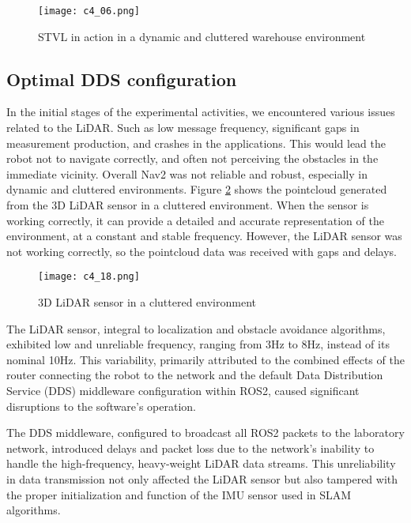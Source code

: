 \begin{figure}[t]
    \centering
    \texttt{[image: c4\_06.png]}
    \caption{STVL in action in a dynamic and cluttered warehouse environment}
    \label{fig:stvl}
\end{figure}


\subsection{Optimal DDS configuration}

In the initial stages of the experimental activities, we encountered various issues related to the LiDAR. 
Such as low message frequency, significant gaps in measurement production, and crashes in the applications.
This would lead the robot not to navigate correctly, and often not perceiving the obstacles in the immediate vicinity.
Overall Nav2 was not reliable and robust, especially in dynamic and cluttered environments.
Figure \ref{fig:3dlidar} shows the pointcloud generated from the 3D LiDAR sensor in a cluttered environment.
When the sensor is working correctly, it can provide a detailed and accurate representation of the environment,
at a constant and stable frequency. However, the LiDAR sensor was not working correctly, so the pointcloud data
was received with gaps and delays.

\begin{figure}[t]
    \centering
    \texttt{[image: c4\_18.png]}
    \caption{3D LiDAR sensor in a cluttered environment}
    \label{fig:3dlidar}
\end{figure}

The LiDAR sensor, integral to localization and obstacle avoidance algorithms, exhibited low and unreliable frequency,
ranging from 3Hz to 8Hz, instead of its nominal 10Hz.  This variability, primarily attributed to the combined 
effects of the router connecting the robot to the network and the default Data Distribution Service (DDS) middleware 
configuration within ROS2, caused significant disruptions to the software's operation.

The DDS middleware, configured to broadcast all ROS2 packets to the laboratory network, introduced delays and packet loss
due to the network's inability to handle the high-frequency, heavy-weight LiDAR data streams.  
This unreliability in data transmission not only affected the LiDAR sensor but also tampered with the proper 
initialization and function of the IMU sensor used in SLAM algorithms.

